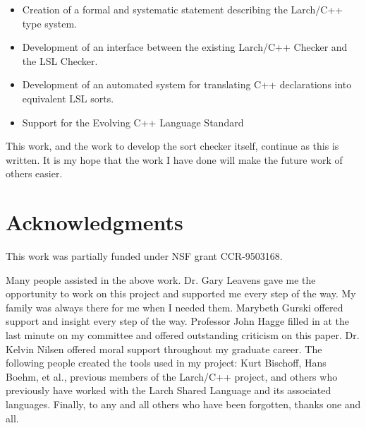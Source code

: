 \documentclass[12pt]{article} %
\begin{document}
\begin{itemize}

\item Creation of a formal and systematic statement describing the
Larch/C++ type system.

\item Development of an interface between the existing Larch/C++ Checker and
the LSL Checker.

\item Development of an automated system for translating C++
declarations into equivalent LSL sorts.

\item Support for the Evolving C++ Language Standard

\end{itemize}

This work, and the work to develop the sort checker itself, continue
as this is written. It is my hope that the work I have done will make
the future work of others easier.

\section{Acknowledgments}
\label{ack}
This work was partially funded under NSF grant CCR-9503168.

Many people assisted in the above work. Dr. Gary Leavens gave me the
opportunity to work on this project and supported me every step of the
way. My family was always there for me when I needed them.  Marybeth
Gurski offered support and insight every step of the way. Professor
John Hagge filled in at the last minute on my committee and offered
outstanding criticism on this paper. Dr. Kelvin Nilsen offered moral
support throughout my graduate career. The following people created
the tools used in my project: Kurt Bischoff, Hans Boehm, et al.,
previous members of the Larch/C++ project, and others who previously
have worked with the Larch Shared Language and its associated
languages. Finally, to any and all others who have been forgotten,
thanks one and all.


\end{document}
